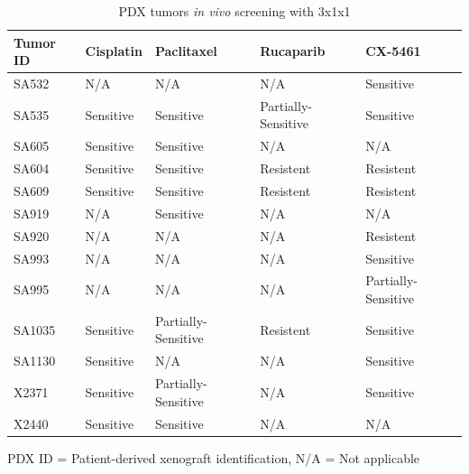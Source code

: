 \begin{table}[htbp]
  \centering
  \caption{PDX tumors \textit{in vivo} screening with 3x1x1}
    \begin{tabular}{lllll}
    
     \hline
    \textbf{Tumor ID} & \textbf{Cisplatin} & \textbf{Paclitaxel} & \textbf{Rucaparib} & \textbf{CX-5461} \\
     \hline
    SA532 & N/A   & N/A   & N/A   & Sensitive \\
    SA535 & Sensitive & Sensitive & Partially-Sensitive & Sensitive \\
    SA605 & Sensitive & Sensitive & N/A   & N/A \\
    SA604 & Sensitive & Sensitive & Resistent & Resistent \\
    SA609 & Sensitive & Sensitive & Resistent & Resistent \\
    SA919 & N/A   & Sensitive & N/A   & N/A \\
    SA920 & N/A   & N/A   & N/A   & Resistent \\
    SA993 & N/A   & N/A   & N/A   & Sensitive \\
    SA995 & N/A   & N/A   & N/A   & Partially-Sensitive \\
    SA1035 & Sensitive & Partially-Sensitive & Resistent & Sensitive \\
    SA1130 & Sensitive & N/A   & N/A   & Sensitive \\
    X2371 & Sensitive & Partially-Sensitive & N/A   & Sensitive \\
    X2440 & Sensitive & Sensitive & N/A   & N/A \\
     \hline
    \end{tabular}%
    
PDX ID = Patient-derived xenograft identification, N/A = Not applicable\\
  \label{tab:addlabel}%
\end{table}%

